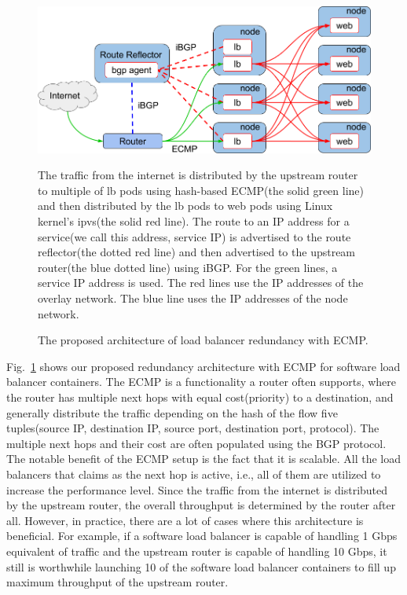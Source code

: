 \begin{figure}[tb]
\begin{center}
\includegraphics[width=\columnwidth]{Figs/ecmp.png}
\end{center}
\caption{The proposed architecture of load balancer redundancy with ECMP.}
  The traffic from the internet is distributed by the upstream router to multiple of lb pods using hash-based ECMP(the solid green line) and then distributed by the lb pods to web pods using Linux kernel's ipvs(the solid red line).
  The route to an IP address for a service(we call this address, service IP) is advertised to the route reflector(the dotted red line) and then advertised to the upstream router(the blue dotted line) using iBGP.
  For the green lines, a service IP address is used. The red lines use the IP addresses of the overlay network. The blue line uses the IP addresses of the node network.

\label{fig:ecmp}
\end{figure}

Fig.~\ref{fig:ecmp} shows our proposed redundancy architecture with ECMP for software load balancer containers.
%
The ECMP is a functionality a router often supports, where the router has multiple next hops with equal cost(priority) to a destination, and generally distribute the traffic depending on the hash of the flow five tuples(source IP, destination IP, source port, destination port, protocol).
The multiple next hops and their cost are often populated using the BGP protocol.
%
The notable benefit of the ECMP setup is the fact that it is scalable.
All the load balancers that claims as the next hop is active, i.e., all of them are utilized to increase the performance level.
Since the traffic from the internet is distributed by the upstream router, the overall throughput is determined by the router after all.
However, in practice, there are a lot of cases where this architecture is beneficial.
For example, if a software load balancer is capable of handling 1 Gbps equivalent of traffic and the upstream router is capable of handling 10 Gbps, it still is worthwhile launching 10 of the software load balancer containers to fill up maximum throughput of the upstream router.

